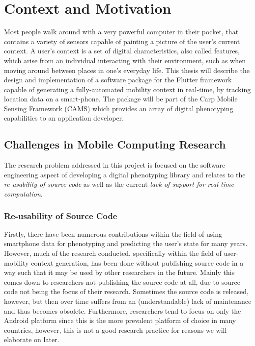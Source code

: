 \section{Context and Motivation}


Most people walk around with a very powerful computer in their pocket, that contains a variety of sensors capable of painting a picture of the user's current context. A user's context is a set of digital characteristics, also called features, which arise from an individual interacting with their environment, such as when moving around between places in one's everyday life. This thesis will describe the design and implementation of a software package for the Flutter framework capable of generating a fully-automated mobility context in real-time, by tracking location data on a smart-phone. The package will be part of the Carp Mobile Sensing Framework (CAMS) which provides an array of digital phenotyping capabilities to an application developer.\\

\subsection{Challenges in Mobile Computing Research}
The research problem addressed in this project is focused on the software engineering aspect of developing a digital phenotyping library and relates to the \textit{re-usability of source code} as well as the current \textit{lack of support for real-time computation}.

\subsubsection{Re-usability of Source Code}
Firstly, there have been numerous contributions within the field of using smartphone data for phenotyping and predicting the user's state for many years. However, much of the research conducted, specifically within the field of user-mobility context generation, has been done without publishing source code in a way such that it may be used by other researchers in the future. Mainly this comes down to researchers not publishing the source code at all, due to source code not being the focus of their research. Sometimes the source code is released, however, but then over time suffers from an (understandable) lack of maintenance and thus becomes obsolete. Furthermore, researchers tend to focus on only the Android platform since this is the more prevalent platform of choice in many countries, however, this is not a good research practice for reasons we will elaborate on later.

